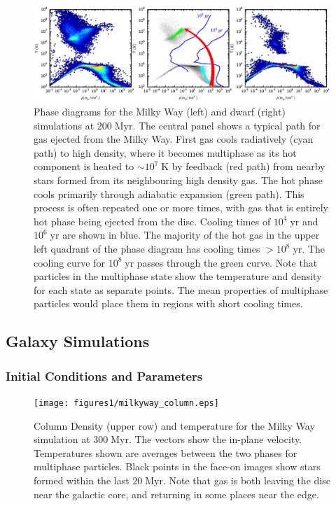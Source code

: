 \begin{figure}
    \includegraphics[width=\textwidth]{figures1/disc_phase.eps}
    \caption[Phase diagram of gas in isolated galaxies]{Phase diagrams for the
    Milky Way (left) and dwarf (right) simulations at $200\;\mathrm{Myr}$.  The
    central panel shows a typical path for gas ejected from the Milky Way.
    First gas cools radiatively (cyan path) to high density, where it becomes
    multiphase as its hot component is heated to $\sim10^7\;\mathrm{K}$ by
    feedback (red path) from nearby stars formed from its neighbouring high
    density gas.  The hot phase cools primarily through adiabatic expansion
    (green path).  This process is often repeated one or more times, with gas
    that is entirely hot phase being ejected from the disc.  Cooling times of
    $10^4\;\mathrm{yr}$ and $10^6\;\mathrm{yr}$ are shown in blue. The
    majority of the hot gas in the upper left quadrant of the phase diagram has
    cooling times $>10^8\;\mathrm{yr}$.  The cooling curve for
    $10^8\;\mathrm{yr}$ passes through the green curve.  Note that particles in
    the multiphase state show the temperature and density for each state as
    separate points.  The mean properties of multiphase particles would place
    them in regions with short cooling times.}
    \label{disc_phase}
\end{figure}



\subsection{Galaxy Simulations}\label{galaxy}
\subsubsection{Initial Conditions and Parameters}
\begin{figure}
    \texttt{[image: figures1/milkyway\_column.eps]}
    \caption[Column density and temperature images of isolated Milky Way]{Column
    Density (upper row) and temperature for the Milky Way simulation at
    $300\;\mathrm{Myr}$.  The vectors show the in-plane velocity.  Temperatures
    shown are averages between the two phases for multiphase particles.  Black
    points in the face-on images show stars formed within the last
    $20\;\mathrm{Myr}$. Note that gas is both leaving the disc near the galactic
    core, and returning in some places near the edge.}
    \label{milkyway_column}
\end{figure}


